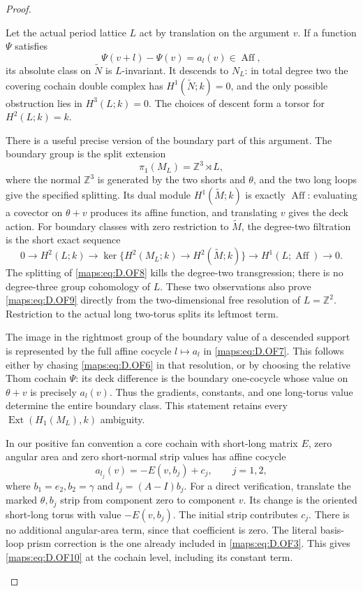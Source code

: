 \begin{proof}
\begin{enumerate}[label=\arabic*.,leftmargin=*]
Let the actual period lattice \(L\) act by translation on the
argument \(v\). If a function \(\Psi\) satisfies
\[
                  \Psi(v+l)-\Psi(v)=a_l(v)
                       \in\operatorname{Aff},           \tag{D.OF7}\label{maps:eq:D.OF7}
\]
its absolute class on \(\widetilde N\) is \(L\)-invariant.
It descends to \(N_L\): in total degree two the covering
cochain double complex has \(H^1(\widetilde N;k)=0\), and
the only possible obstruction lies in \(H^3(L;k)=0\).
The choices of descent form a torsor for \(H^2(L;k)=k\).

There is a useful precise version of the boundary part of this
argument. The boundary group is the split extension
\[
       \pi_1(M_L)=\mathbb Z^3\rtimes L,                    \tag{D.OF8}\label{maps:eq:D.OF8}
\]
where the normal \(\mathbb Z^3\) is generated by the two shorts
and \(\theta\), and the two long loops give the specified splitting.
Its dual module \(H^1(\widetilde M;k)\) is exactly
\(\operatorname{Aff}\): evaluating a covector on
\(\theta+v\) produces its affine function, and translating \(v\)
gives the deck action.
For boundary classes with zero restriction to \(\widetilde M\),
the degree-two filtration is the short exact sequence
\[
 0\longrightarrow H^2(L;k)\longrightarrow
 \ker\{H^2(M_L;k)\to H^2(\widetilde M;k)\}
 \longrightarrow H^1(L;\operatorname{Aff})\longrightarrow0.
                                                               \tag{D.OF9}\label{maps:eq:D.OF9}
\]
The splitting of \eqref{maps:eq:D.OF8} kills the degree-two transgression;
there is no degree-three group cohomology of \(L\).
These two observations also prove \eqref{maps:eq:D.OF9} directly from the
two-dimensional free resolution of \(L=\mathbb Z^2\).
Restriction to the actual long two-torus splits its leftmost term.

The image in the rightmost group of the boundary value of a
descended support is represented by the full affine cocycle
\(l\mapsto a_l\) in \eqref{maps:eq:D.OF7}. This follows either by chasing
\eqref{maps:eq:D.OF6} in that resolution, or by choosing the relative Thom
cochain \(\Psi\): its deck difference is the boundary one-cocycle
whose value on \(\theta+v\) is precisely \(a_l(v)\).
Thus the gradients, constants, and one long-torus value determine
the entire boundary class. This statement retains every
\(\operatorname{Ext}(H_1(M_L),k)\) ambiguity.

In our positive fan convention a core cochain with short-long
matrix \(E\), zero angular area and zero short-normal strip values
has affine cocycle
\[
 a_{l_j}(v)=-E(v,b_j)+c_j,\qquad j=1,2,                  \tag{D.OF10}\label{maps:eq:D.OF10}
\]
where \(b_1=e_2,b_2=\gamma\) and \(l_j=(A-I)b_j\).
For a direct verification, translate the marked \(\theta,b_j\)
strip from component zero to component \(v\). Its change is the
oriented short-long torus with value \(-E(v,b_j)\).
The initial strip contributes \(c_j\). There is no additional
angular-area term, since that coefficient is zero. The literal
basis-loop prism correction is the one already included in
\eqref{maps:eq:D.OF3}. This gives \eqref{maps:eq:D.OF10} at the cochain level, including
its constant term.


\end{enumerate}
\end{proof}
